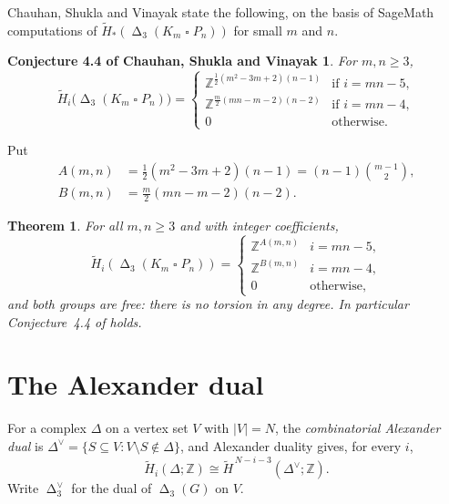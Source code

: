 \documentclass[11pt]{amsart}
\newtheorem{theorem}{Theorem}
\newtheorem*{conjecture*}{Conjecture 4.4 of Chauhan, Shukla and Vinayak}
\DeclareMathOperator{\Cut}{\Delta}
\newcommand{\Dual}[1]{#1^{\vee}}
\newcommand{\Hred}{\widetilde H}
\newcommand{\bbox}{\mathbin{\square}}
\begin{document}
Chauhan, Shukla and Vinayak \cite[Conjecture~4.4]{CSV} state the following, on the basis of
SageMath computations of $\Hred_*(\Cut_3(K_m\bbox P_n))$ for small $m$ and $n$.

\begin{conjecture*}
For $m, n \ge 3$,
\[
  \Hred_i\bigl(\Cut_3(K_m \bbox P_n)\bigr)
  =
  \begin{cases}
    \mathbb Z^{\frac12(m^2-3m+2)(n-1)} & \text{if } i = mn-5,\\
    \mathbb Z^{\frac{m}{2}(mn-m-2)(n-2)} & \text{if } i = mn-4,\\
    0 & \text{otherwise.}
  \end{cases}
\]
\end{conjecture*}

Put
\begin{equation}\label{eq:AB}
\begin{aligned}
  A(m,n) &= \tfrac12(m^2-3m+2)(n-1) = (n-1)\binom{m-1}{2},\\
  B(m,n) &= \tfrac{m}{2}(mn-m-2)(n-2).
\end{aligned}
\end{equation}

\begin{theorem}\label{thm:main}
For all $m,n \ge 3$ and with integer coefficients,
\[
  \Hred_i(\Cut_3(K_m \bbox P_n))
  =
  \begin{cases}
    \mathbb Z^{A(m,n)} & i = mn-5,\\
    \mathbb Z^{B(m,n)} & i = mn-4,\\
    0 & \text{otherwise,}
  \end{cases}
\]
and both groups are free: there is no torsion in any degree. In particular Conjecture~4.4 of
\cite{CSV} holds.
\end{theorem}

\section{The Alexander dual}

For a complex $\Delta$ on a vertex set $V$ with $|V| = N$, the \emph{combinatorial Alexander dual}
is $\Dual{\Delta} = \{S \subseteq V : V\setminus S \notin \Delta\}$, and Alexander duality
\cite[Theorem~5.6]{MillerSturmfels} gives, for every $i$,
\begin{equation}\label{eq:AD}
  \Hred_i(\Delta;\mathbb Z) \cong \Hred^{\,N-i-3}(\Dual{\Delta};\mathbb Z).
\end{equation}
Write $\Dual{\Cut_3}$ for the dual of $\Cut_3(G)$ on $V$.
\end{document}
